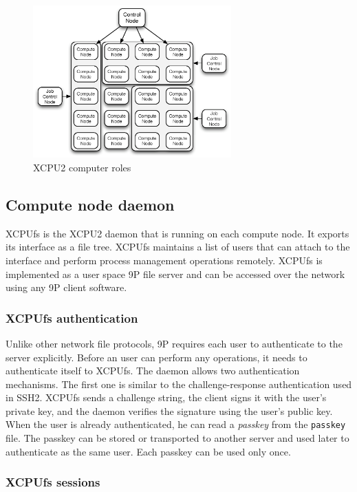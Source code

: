 \documentclass[10pt,conference,letterpaper]{IEEEtran}
\begin{document}
\begin{figure}[h]
\begin{center}
\includegraphics[width=3in, keepaspectratio]{xcpu2-nodes.eps}
\end{center}
\caption{XCPU2 computer roles}
\label{fig:XCPU2-nodes}
\end{figure}

\subsection{Compute node daemon}

XCPUfs is the XCPU2 daemon that is running on each compute node. It exports
its interface as a file tree. XCPUfs maintains a list of users that can
attach to the interface and perform process management operations remotely.
XCPUfs is implemented as a user space 9P file server and can be accessed
over the network using any 9P client software.

\subsubsection{XCPUfs authentication}

Unlike other network file protocols, 9P requires each user to authenticate
to the server explicitly. Before an user can perform any operations, it
needs to authenticate itself to XCPUfs. The daemon allows two authentication
mechanisms. The first one is similar to the challenge-response
authentication used in SSH2. XCPUfs sends a challenge string, the client
signs it with the user's private key, and the daemon verifies the signature
using the user's public key. When the user is already authenticated, he can
read a \textsl{passkey} from the \texttt{passkey} file. The passkey can be
stored or transported to another server and used later to authenticate as
the same user. Each passkey can be used only once.

\subsubsection{XCPUfs sessions}
\end{document}

